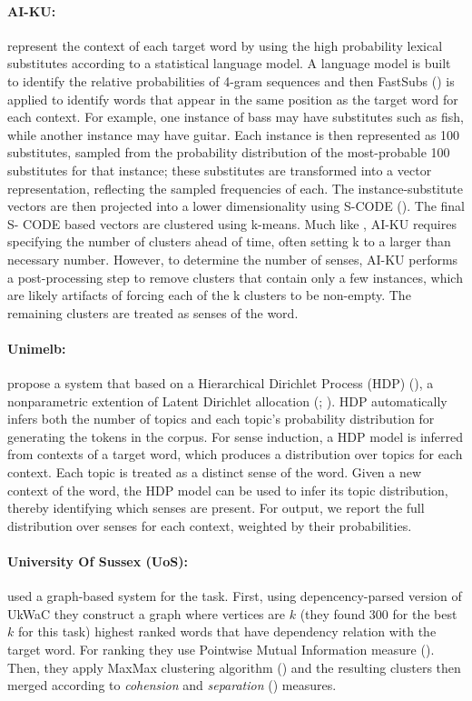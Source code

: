 \paragraph{AI-KU:} \cite{baskaya13ai} represent the context of each target word by using the high probability lexical substitutes according to a statistical language model. A language model is built to identify the relative probabilities of 4-gram sequences and then FastSubs (\cite{fastsubs}) is applied to identify words that appear in the same position as the target word for each context. For example, one instance of bass may have substitutes such as fish, while another instance may have guitar. Each instance is then represented as 100 substitutes, sampled from the probability distribution of the most-probable 100 substitutes for that instance; these substitutes are transformed into a vector representation, reflecting the sampled frequencies of each. The instance-substitute vectors are then projected into a lower dimensionality using S-CODE (\cite{Maron2010}). The final S- CODE based vectors are clustered using k-means. Much like \cite{schutze98automatic}, AI-KU requires specifying the number of clusters ahead of time, often setting k to a larger than necessary number. However, to determine the number of senses, AI-KU performs a post-processing step to remove clusters that contain only a few instances, which are likely artifacts of forcing each of the k clusters to be non-empty. The remaining clusters are treated as senses of the word.

\paragraph{Unimelb:} \cite{lau13word} propose a system that based on a Hierarchical Dirichlet Process (HDP) (\cite{teh06hierarchical}), a nonparametric extention of Latent Dirichlet allocation (\cite{blei03latent}; \cite{steyvers04word}). HDP automatically infers both the number of topics and each topic’s probability distribution for generating the tokens in the corpus. For sense induction, a HDP model is inferred from contexts of a target word, which produces a distribution over topics for each context. Each topic is treated as a distinct sense of the word. Given a new context of the word, the HDP model can be used to infer its topic distribution, thereby identifying which senses are present. For output, we report the full distribution over senses for each context, weighted by their probabilities.

\paragraph{University Of Sussex (UoS):} \cite{hope2013uos} used a graph-based system for the task. First, using depencency-parsed version of UkWaC they construct a graph where vertices are $k$ (they found 300 for the best $k$ for this task) highest ranked words that have dependency relation with the target word. For ranking they use Pointwise Mutual Information measure (\cite{bouma2009pointwise}). Then, they apply MaxMax clustering algorithm (\cite{hope2013maxmax}) and the resulting clusters then merged according to \emph{cohension} and \emph{separation} (\cite{pang2006introduction}) measures.

